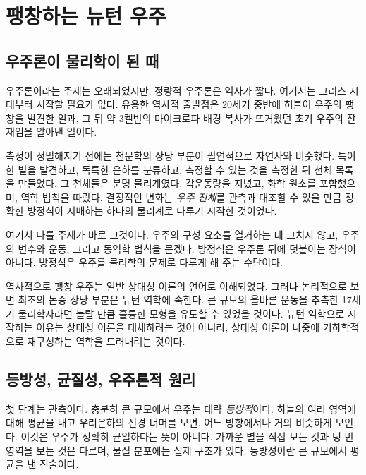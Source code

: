 \chapter{팽창하는 뉴턴 우주}


\section{우주론이 물리학이 된 때}

우주론이라는 주제는 오래되었지만, 정량적 우주론은 역사가 짧다. 여기서는 그리스 시대부터 시작할 필요가 없다. 유용한 역사적 출발점은 20세기 중반에 허블이 우주의 팽창을 발견한 일과, 그 뒤 약 3켈빈의 마이크로파 배경 복사가 뜨거웠던 초기 우주의 잔재임을 알아낸 일이다.

측정이 정밀해지기 전에는 천문학의 상당 부분이 필연적으로 자연사와 비슷했다. 특이한 별을 발견하고, 독특한 은하를 분류하고, 측정할 수 있는 것을 측정한 뒤 천체 목록을 만들었다. 그 천체들은 분명 물리계였다. 각운동량을 지녔고, 화학 원소를 포함했으며, 역학 법칙을 따랐다. 결정적인 변화는 \emph{우주 전체}를 관측과 대조할 수 있을 만큼 정확한 방정식이 지배하는 하나의 물리계로 다루기 시작한 것이었다.

여기서 다룰 주제가 바로 그것이다. 우주의 구성 요소를 열거하는 데 그치지 않고, 우주의 변수와 운동, 그리고 동역학 법칙을 묻겠다. 방정식은 우주론 뒤에 덧붙이는 장식이 아니다. 방정식은 우주를 물리학의 문제로 다루게 해 주는 수단이다.

역사적으로 팽창 우주는 일반 상대성 이론의 언어로 이해되었다. 그러나 논리적으로 보면 최초의 논증 상당 부분은 뉴턴 역학에 속한다. 큰 규모의 올바른 운동을 추측한 17세기 물리학자라면 놀랄 만큼 훌륭한 모형을 유도할 수 있었을 것이다. 뉴턴 역학으로 시작하는 이유는 상대성 이론을 대체하려는 것이 아니라, 상대성 이론이 나중에 기하학적으로 재구성하는 역학을 드러내려는 것이다.

\section{등방성, 균질성, 우주론적 원리}

첫 단계는 관측이다. 충분히 큰 규모에서 우주는 대략 \emph{등방적}이다. 하늘의 여러 영역에 대해 평균을 내고 우리은하의 전경 너머를 보면, 어느 방향에서나 거의 비슷하게 보인다. 이것은 우주가 정확히 균일하다는 뜻이 아니다. 가까운 별을 직접 보는 것과 텅 빈 영역을 보는 것은 다르며, 물질 분포에는 실제 구조가 있다. 등방성이란 큰 규모에서 평균을 낸 진술이다.

